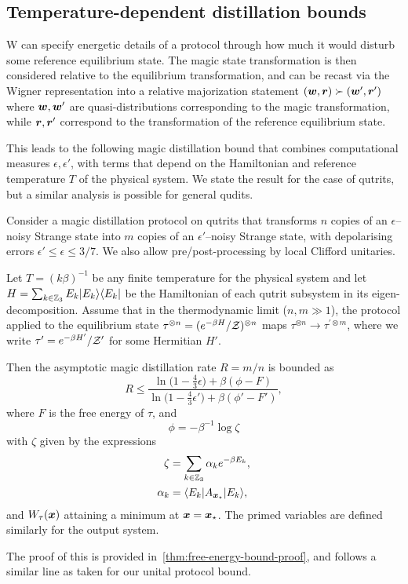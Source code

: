 \documentclass[pra,
aps,
twocolumn,
superscriptaddress,
groupedaddress,
nofootinbib,
reprint
]{revtex4-1}
\begin{document}
\subsection{Temperature-dependent distillation bounds}

W  can specify energetic details of a protocol through how much it would disturb some reference equilibrium state. The magic state transformation is then considered relative to the equilibrium transformation, and can be recast via the Wigner representation into a relative majorization statement $(\boldsymbol{w}, \boldsymbol{r}) \succ (\boldsymbol{w}', \boldsymbol{r}')$ where $\boldsymbol{w}, \boldsymbol{w}'$ are quasi-distributions corresponding to the magic transformation, while $\boldsymbol{r}, \boldsymbol{r}'$ correspond to the transformation of the reference equilibrium state. 

This leads to the following magic distillation bound that combines computational measures $\epsilon,\epsilon'$, with terms that depend on the Hamiltonian and reference temperature $T$ of the physical system. We state the result for the case of qutrits, but a similar analysis is possible for general qudits.

\begin{theorem}\label{thm:free-energy}
	Consider a magic distillation protocol on qutrits that transforms $n$ copies of an $\epsilon$--noisy Strange state into $m$ copies of an $\epsilon'$--noisy Strange state, with depolarising errors $\epsilon' \leq \epsilon \leq 3/7$. We also allow pre/post-processing by local Clifford unitaries.
	
	Let $T =(k\beta)^{-1}$ be any finite temperature for the physical system and let $H= \sum_{k \in \mathbb{Z}_3} E_k |E_k\rangle\langle E_k|$ be the Hamiltonian of each qutrit subsystem in its eigen-decomposition.
Assume that in the thermodynamic limit ($n,m \gg 1$), the protocol applied to the equilibrium state $\tau^{\otimes n} = (e^{-\beta H}/\mathcal{Z})^{\otimes n}$ maps $\tau^{\otimes n} \longrightarrow \tau^{\prime \otimes m}$, where we write $\tau' = e^{-\beta H'}/\mathcal{Z}'$ for some Hermitian $H'$.

Then the asymptotic magic distillation rate $R = m/n$ is bounded as
\begin{equation}\label{eq:rate_bounds_proof}
	R \leq \dfrac{\ln \big( 1-\frac{4}{3}\epsilon \big) + \beta (\phi - F)}{\ln \big( 1-\frac{4}{3}\epsilon' \big) + \beta (\phi' - F')},
\end{equation}
where $F$ is the free energy of $\tau$,  and 
\begin{equation}
	\phi = -\beta^{-1} \log \zeta
\end{equation}
with $\zeta$ given by the expressions
\begin{align}
	\zeta &= \sum_{k\in \mathbb{Z}_3} \alpha_k e^{-\beta E_k}, \nonumber\\
	\alpha_k &= \langle E_k| A_{\boldsymbol{x}_\star} |E_k\rangle,
\end{align}
and $W_\tau(\boldsymbol{x})$ attaining a minimum at $\boldsymbol{x}=\boldsymbol{x}_\star$. The primed variables are defined similarly for the output system.
\end{theorem}
\noindent The proof of this is provided in~\cref{thm:free-energy-bound-proof}, and follows a similar line as taken for our unital protocol bound.
\end{document}
